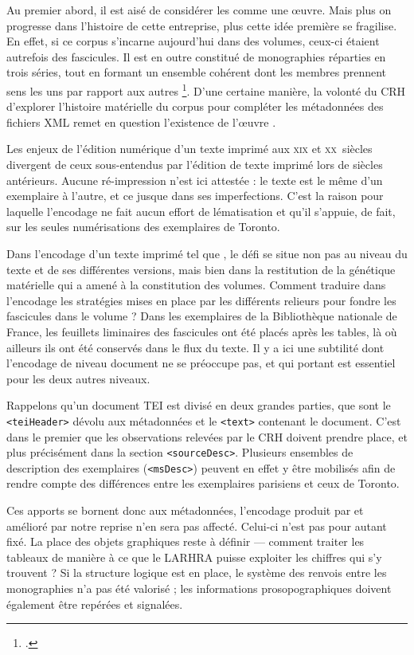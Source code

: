 Au premier abord, il est aisé de considérer les \odm{} comme une \oe{}uvre. Mais plus on progresse dans l'histoire de cette entreprise, plus cette idée première se fragilise. En effet, si ce corpus s'incarne aujourd'hui dans des volumes, ceux-ci étaient autrefois des fascicules. Il est en outre constitué de monographies réparties en trois séries, tout en formant un ensemble cohérent dont les membres \og prennent sens les uns par rapport aux autres \fg{}\footcite[p. 5]{chenu}. D'une certaine manière, la volonté du CRH d'explorer l'histoire matérielle du corpus pour compléter les métadonnées des fichiers XML remet en question l'existence de \og l'\oe{}uvre \odm{} \fg{}.

Les enjeux de l'édition numérique d'un texte imprimé aux \textsc{xix}\ieme{} et \textsc{xx}\ieme~siècles divergent de ceux sous-entendus par l'édition de texte imprimé lors de siècles antérieurs. Aucune ré-impression n'est ici attestée : le texte est le même d'un exemplaire à l'autre, et ce jusque dans ses imperfections. C'est la raison pour laquelle l'encodage ne fait aucun effort de lématisation et qu'il s'appuie, de fait, sur les seules numérisations des exemplaires de Toronto.

Dans l'encodage d'un texte imprimé tel que \lodm{}, le défi se situe non pas au niveau du texte et de ses différentes versions, mais bien dans la restitution de la génétique matérielle qui a amené à la constitution des volumes. Comment traduire dans l'encodage les stratégies mises en place par les différents relieurs pour fondre les fascicules dans le volume ? Dans les exemplaires de la Bibliothèque nationale de France, les feuillets liminaires des fascicules ont été placés après les tables, là où ailleurs ils ont été conservés dans le flux du texte. Il y a ici une subtilité dont l'encodage de niveau \og document \fg{} ne se préoccupe pas, et qui portant est essentiel pour les deux autres niveaux.

Rappelons qu'un document TEI est divisé en deux grandes parties, que sont le \texttt{<teiHeader>} dévolu aux métadonnées et le \texttt{<text>} contenant le document. C'est dans le premier que les observations relevées par le CRH doivent prendre place, et plus précisément dans la section \texttt{<sourceDesc>}. Plusieurs ensembles de description des exemplaires (\texttt{<msDesc>}) peuvent en effet y être mobilisés afin de rendre compte des différences entre les exemplaires parisiens et ceux de Toronto.

Ces apports se bornent donc aux métadonnées, l'encodage produit par \lse{} et amélioré par notre reprise n'en sera pas affecté. Celui-ci n'est pas pour autant fixé. La place des objets graphiques reste à définir --- comment traiter les tableaux de manière à ce que le LARHRA puisse exploiter les chiffres qui s'y trouvent ? Si la structure logique est en place, le système des renvois entre les monographies n'a pas été valorisé ; les informations prosopographiques doivent également être repérées et signalées.

